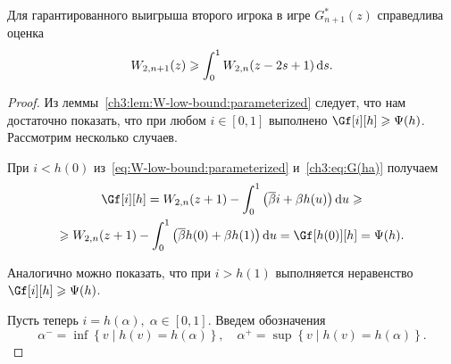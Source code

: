 {\begin{theorem}\label{ch3:thm:W-bound}
  Для гарантированного выигрыша второго игрока в игре $G_{n+1}^*(z)$ справедлива оценка
  \begin{equation*}
    W_{2,n+1}(z) \geqslant \int_0^1 W_{2,n}(z - 2s + 1) \mathop{}\!\mathrm{d} s.
  \end{equation*}
\end{theorem}
\begin{proof}
  Из леммы~\ref{ch3:lem:W-low-bound:parameterized} следует, что нам достаточно показать, что при любом $i \in [0, 1]$ выполнено $\Gf[i][h] \geqslant \Psi(h)$.
  Рассмотрим несколько случаев.

  При $i < h(0)$ из~\eqref{eq:W-low-bound:parameterized} и~\eqref{ch3:eq:G(ha)} получаем
  \begin{multline*}
    \Gf[i][h] =
    W_{2,n}(z + 1) - \int_0^1 \left( \DCo i + \Co h(u) \right) \di u \geqslant \\
    \geqslant W_{2,n}(z + 1) - \int_0^1 \left( \DCo h(0) + \Co h(1) \right) \di
    u = \Gf[h(0)][h] = \Psi(h).
  \end{multline*}

  Аналогично можно показать, что при $i > h(1)$ выполняется неравенство $\Gf[i][h] \geqslant \Psi(h)$.

  Пусть теперь $i = h(\alpha), \; \alpha \in [0, 1]$. Введем обозначения
  \[
    \alpha^- = \inf \left\{ v \;|\; h(v) = h(\alpha) \right\}, \quad \alpha^+ =
    \sup \left\{ v \;|\; h(v) = h(\alpha) \right\}.
  \]
  

\end{proof}}
